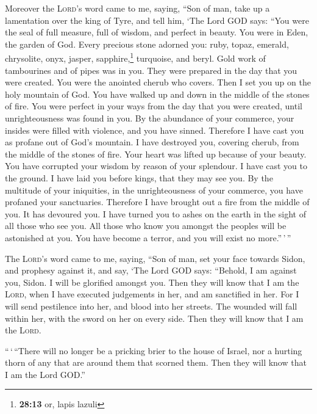  Moreover the \textsc{Lord}'s word came to me, saying,
 ``Son of man, take up a lamentation over the king of
Tyre, and tell him, `The Lord GOD says: ``You were the seal of full
measure, full of wisdom, and perfect in beauty.  You were
in Eden, the garden of God. Every precious stone adorned you: ruby,
topaz, emerald, chrysolite, onyx, jasper, sapphire,\footnote{\textbf{28:13}
  or, lapis lazuli} turquoise, and beryl. Gold work of tambourines and
of pipes was in you. They were prepared in the day that you were
created.  You were the anointed cherub who covers. Then I
set you up on the holy mountain of God. You have walked up and down in
the middle of the stones of fire.  You were perfect in
your ways from the day that you were created, until unrighteousness was
found in you.  By the abundance of your commerce, your
insides were filled with violence, and you have sinned. Therefore I have
cast you as profane out of God's mountain. I have destroyed you,
covering cherub, from the middle of the stones of fire. 
Your heart was lifted up because of your beauty. You have corrupted your
wisdom by reason of your splendour. I have cast you to the ground. I
have laid you before kings, that they may see you.  By
the multitude of your iniquities, in the unrighteousness of your
commerce, you have profaned your sanctuaries. Therefore I have brought
out a fire from the middle of you. It has devoured you. I have turned
you to ashes on the earth in the sight of all those who see you.
 All those who know you amongst the peoples will be
astonished at you. You have become a terror, and you will exist no
more.''\,'\,''

 The \textsc{Lord}'s word came to me, saying,
 ``Son of man, set your face towards Sidon, and prophesy
against it,  and say, `The Lord GOD says: ``Behold, I am
against you, Sidon. I will be glorified amongst you. Then they will know
that I am the \textsc{Lord}, when I have executed judgements in her, and
am sanctified in her.  For I will send pestilence into
her, and blood into her streets. The wounded will fall within her, with
the sword on her on every side. Then they will know that I am the
\textsc{Lord}.

 ``\,`\,``There will no longer be a pricking brier to the
house of Israel, nor a hurting thorn of any that are around them that
scorned them. Then they will know that I am the Lord GOD.''

